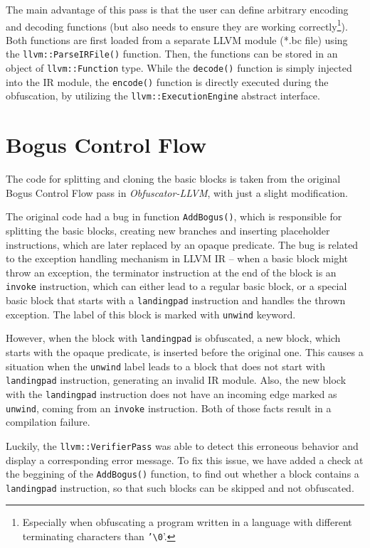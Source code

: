 \documentclass[
  digital, %
  table,   %
  twoside, %
  nolof,     %
  nolot,     %
]{fithesis3}
\theoremstyle{definition}
\begin{document}
The main advantage of this pass is that the user can define arbitrary encoding and decoding functions (but also needs to ensure they are working correctly\footnote{Especially when obfuscating a program written in a language with different terminating characters than \texttt{'\textbackslash0}'.}). Both functions are first loaded from a separate LLVM module (*.bc file) using the \texttt{llvm::ParseIRFile()} function. Then, the functions can be stored in an object of \texttt{llvm::Function} type. While the \texttt{decode()} function is simply injected into the IR module, the \texttt{encode()} function is directly executed during the obfuscation, by utilizing the \texttt{llvm::ExecutionEngine} abstract interface.

\section{Bogus Control Flow}
The code for splitting and cloning the basic blocks is taken from the original Bogus Control Flow pass in \textit{Obfuscator-LLVM}, with just a slight modification. 

The original code had a bug in function \texttt{AddBogus()}, which is responsible for splitting the basic blocks, creating new branches and inserting placeholder instructions, which are later replaced by an opaque predicate. The bug is related to the exception handling mechanism in LLVM IR -- when a basic block might throw an exception, the terminator instruction at the end of the block is an \texttt{invoke} instruction, which can either lead to a regular basic block, or a special basic block that starts with a \texttt{landingpad} instruction and handles the thrown exception. The label of this block is marked with \texttt{unwind} keyword. 

However, when the block with \texttt{landingpad} is obfuscated, a new block, which starts with the opaque predicate, is inserted before the original one. This causes a situation when the \texttt{unwind} label leads to a block that does not start with \texttt{landingpad} instruction, generating an invalid IR module. Also, the new block with the \texttt{landingpad} instruction does not have an incoming edge marked as \texttt{unwind}, coming from an \texttt{invoke} instruction. Both of those facts result in a compilation failure.

Luckily, the \texttt{llvm::VerifierPass} was able to detect this erroneous behavior and display a corresponding error message. To fix this issue, we have added a check at the beggining of the \texttt{AddBogus()} function, to find out whether a block contains a \texttt{landingpad} instruction, so that such blocks can be skipped and not obfuscated. 
\end{document}
